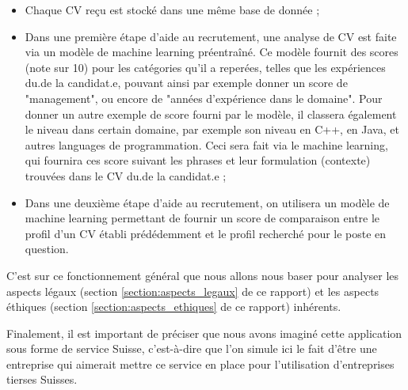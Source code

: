\begin{itemize}
    \item Chaque CV reçu est stocké dans une même base de donnée ;\\
    \item Dans une première étape d'aide au recrutement, une analyse de CV est faite via un modèle de machine learning préentraîné. Ce modèle fournit des scores (note sur 10) pour les catégories qu'il a reperées, telles que les expériences du.de la candidat.e, pouvant ainsi par exemple donner un score de "management", ou encore de "années d'expérience dans le domaine". Pour donner un autre exemple de score fourni par le modèle, il classera également le niveau dans certain domaine, par exemple son niveau en C++, en Java, et autres languages de programmation. Ceci sera fait via le machine learning, qui fournira ces score suivant les phrases et leur formulation (contexte) trouvées dans le CV du.de la candidat.e ;\\
    \item Dans une deuxième étape d'aide au recrutement, on utilisera un modèle de machine learning permettant de fournir un score de comparaison entre le profil d'un CV établi prédédemment et le profil recherché pour le poste en question.\\
\end{itemize}

C'est sur ce fonctionnement général que nous allons nous baser pour analyser les aspects légaux (section \ref{section:aspects_legaux} de ce rapport) et les aspects éthiques (section \ref{section:aspects_ethiques} de ce rapport) inhérents.\newline

Finalement, il est important de préciser que nous avons imaginé cette application sous forme de service Suisse, c'est-à-dire que l'on simule ici le fait d'être une entreprise qui aimerait mettre ce service en place pour l'utilisation d'entreprises tierses Suisses.
